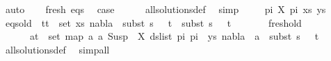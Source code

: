 \begin{isabellebody}
\ auto\isanewline
\ \ \isamarkupfalse%
\ fresh\ eqs\ \isamarkupfalse%
\ {\isacharquery}{\kern0pt}case\isanewline
\ \ \ \ \isamarkupfalse%
\ all{\isacharunderscore}{\kern0pt}solutions{\isacharunderscore}{\kern0pt}def\ \isamarkupfalse%
\ simp\isanewline
{}\isamarkupfalse%
\isanewline
\ \ \isamarkupfalse%
\ {\isacharparenleft}{\kern0pt}{}\ pi{}\ X\ pi{}\ xs\ ys{\isacharparenright}{\kern0pt}\isanewline
\ \ \isamarkupfalse%
\ eqs{\isacharunderscore}{\kern0pt}old{\isacharcolon}{\kern0pt}\ {\isachardoublequoteopen}{\isasymforall}\ {\isacharparenleft}{\kern0pt}t{}{\isacharcomma}{\kern0pt}t{}{\isacharparenright}{\kern0pt}\ {\isasymin}\ set\ xs{\isachardot}{\kern0pt}\ nabla{}\ {\isasymturnstile}\ subst\ {\isacharparenleft}{\kern0pt}s{}\ {\isasymbullet}\ {\isacharbrackleft}{\kern0pt}{\isacharbrackright}{\kern0pt}{\isacharparenright}{\kern0pt}\ t{}\ {\isasymapprox}\ subst\ {\isacharparenleft}{\kern0pt}s{}\ {\isasymbullet}\ {\isacharbrackleft}{\kern0pt}{\isacharbrackright}{\kern0pt}{\isacharparenright}{\kern0pt}\ t{}{\isachardoublequoteclose}\ \isanewline
\ \ \ \ \ \ fresh{\isacharunderscore}{\kern0pt}old{\isacharcolon}{\kern0pt}\ \isanewline
\ \ \ \ \ {\isachardoublequoteopen}{\isasymforall}\ {\isacharparenleft}{\kern0pt}a{\isacharcomma}{\kern0pt}t{\isacharparenright}{\kern0pt}\ {\isasymin}\ set\ {\isacharparenleft}{\kern0pt}map\ {\isacharparenleft}{\kern0pt}{\isasymlambda}a{\isachardot}{\kern0pt}\ {\isacharparenleft}{\kern0pt}a{\isacharcomma}{\kern0pt}\ Susp\ {\isacharbrackleft}{\kern0pt}{\isacharbrackright}{\kern0pt}\ X{\isacharparenright}{\kern0pt}{\isacharparenright}{\kern0pt}\ {\isacharparenleft}{\kern0pt}ds{\isacharunderscore}{\kern0pt}list\ pi{}\ pi{}{\isacharparenright}{\kern0pt}\ {\isacharat}{\kern0pt}\ ys{\isacharparenright}{\kern0pt}{\isachardot}{\kern0pt}\ nabla{}\ {\isasymturnstile}\ a\ {\isasymsharp}\ subst\ {\isacharparenleft}{\kern0pt}s{}\ {\isasymbullet}\ {\isacharbrackleft}{\kern0pt}{\isacharbrackright}{\kern0pt}{\isacharparenright}{\kern0pt}\ t{\isachardoublequoteclose}\isanewline
\ \ \ \ \isamarkupfalse%
\ all{\isacharunderscore}{\kern0pt}solutions{\isacharunderscore}{\kern0pt}def\ \isamarkupfalse%
\ simp{\isacharunderscore}{\kern0pt}all\isanewline
\ \ \isamarkupfalse%

\end{isabellebody}
